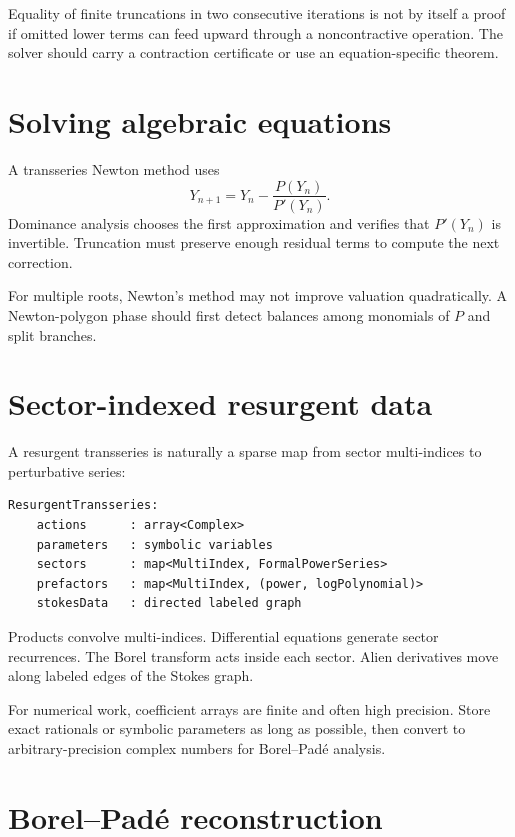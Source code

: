 \documentclass[11pt,openany]{book}
\theoremstyle{definition}
\theoremstyle{plain}
\theoremstyle{remark}
\begin{document}
Equality of finite truncations in two consecutive iterations is not by itself a proof if omitted lower terms can feed upward through a noncontractive operation. The solver should carry a contraction certificate or use an equation-specific theorem.

\section{Solving algebraic equations}

A transseries Newton method uses
\begin{equation}\label{eq:computer-newton}
 Y_{n+1}=Y_n-\frac{P(Y_n)}{P'(Y_n)}.
\end{equation}
Dominance analysis chooses the first approximation and verifies that $P'(Y_n)$ is invertible. Truncation must preserve enough residual terms to compute the next correction.

For multiple roots, Newton's method may not improve valuation quadratically. A Newton-polygon phase should first detect balances among monomials of $P$ and split branches.

\section{Sector-indexed resurgent data}

A resurgent transseries is naturally a sparse map from sector multi-indices to perturbative series:

\begin{lstlisting}[style=pseudo]
ResurgentTransseries:
    actions      : array<Complex>
    parameters   : symbolic variables
    sectors      : map<MultiIndex, FormalPowerSeries>
    prefactors   : map<MultiIndex, (power, logPolynomial)>
    stokesData   : directed labeled graph
\end{lstlisting}

Products convolve multi-indices. Differential equations generate sector recurrences. The Borel transform acts inside each sector. Alien derivatives move along labeled edges of the Stokes graph.

For numerical work, coefficient arrays are finite and often high precision. Store exact rationals or symbolic parameters as long as possible, then convert to arbitrary-precision complex numbers for Borel--Pad\'e analysis.

\section{Borel--Pad\'e reconstruction}
\end{document}
